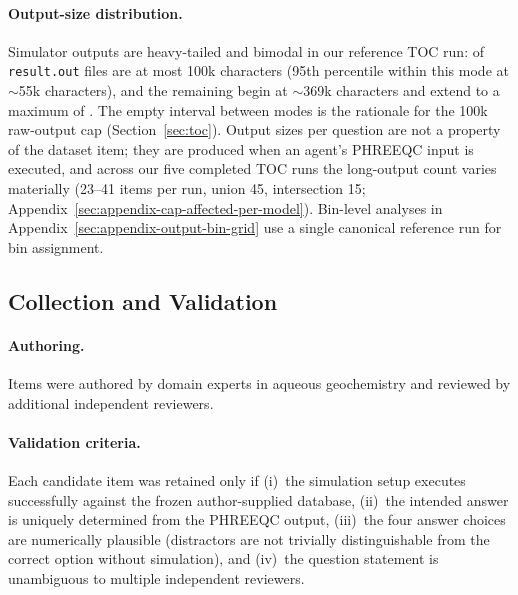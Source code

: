 \documentclass{article}
\begin{document}
\paragraph{Output-size distribution.}
Simulator outputs are heavy-tailed and bimodal in our reference TOC run: \OutputLeHundredK{} of \texttt{result.out} files are at most 100k characters (95th percentile within this mode at $\sim$55k characters), and the remaining \OutputGtHundredK{} begin at $\sim$369k characters and extend to a maximum of \OutputMaxChars. The empty interval between modes is the rationale for the 100k raw-output cap (Section~\ref{sec:toc}). Output sizes per question are not a property of the dataset item; they are produced when an agent's PHREEQC input is executed, and across our five completed TOC runs the long-output count varies materially (23--41 items per run, union 45, intersection 15; Appendix~\ref{sec:appendix-cap-affected-per-model}). Bin-level analyses in Appendix~\ref{sec:appendix-output-bin-grid} use a single canonical reference run for bin assignment.

\subsection{Collection and Validation}

\paragraph{Authoring.}
Items were authored by domain experts in aqueous geochemistry and reviewed by additional independent reviewers.

\paragraph{Validation criteria.}
Each candidate item was retained only if (i)~the simulation setup executes successfully against the frozen author-supplied database, (ii)~the intended answer is uniquely determined from the PHREEQC output, (iii)~the four answer choices are numerically plausible (distractors are not trivially distinguishable from the correct option without simulation), and (iv)~the question statement is unambiguous to multiple independent reviewers.

\newpage

\end{document}
